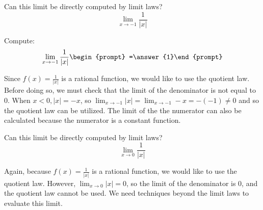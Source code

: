 \documentclass[handout]{ximera}
\begin{document}
\begin{exercise}
  Can this limit be directly computed by limit laws?
  \[
  \displaystyle\lim_{x\to -1} \frac{1}{|x|}
  \]
  \begin{multipleChoice}
  \end{multipleChoice}
  \begin{question}
    Compute:
    \[
    \displaystyle\lim_{x\to -1} \frac{1}{|x|} \begin{prompt} =\answer{1}\end{prompt}
    \]
    \begin{feedback}
      Since $f(x)=\frac{1}{|x|}$ is a rational function, we would like to use the quotient law.  Before doing so, we must check that the limit of the denominator is not equal to $0$.  When $x < 0, |x| = -x$, so $\displaystyle\lim_{x\to -1} |x| = \displaystyle\lim_{x\to -1} -x = -(-1) \neq 0$ and so the quotient law can be utilized. The limit of the the numerator can also be calculated because the numerator is a constant function. 
    \end{feedback}
  \end{question}
\end{exercise}

\begin{exercise}
  Can this limit be directly computed by limit laws?
  \[
  \displaystyle\lim_{x\to 0} \frac{1}{|x|}
  \]
  \begin{multipleChoice}
    
     \begin{feedback}
      Again, because $f(x)=\frac{1}{|x|}$ is a rational function, we would like to use the quotient law.  However, $\displaystyle\lim_{x\to 0} |x| = 0$, so the limit of the denominator is $0$, and the quotient law cannot be used.  We need techniques beyond the limit laws to evaluate this limit. 
    \end{feedback}
    
  \end{multipleChoice}
\end{exercise}
\end{document}
